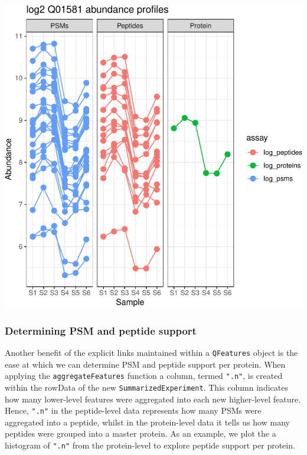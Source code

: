 \documentclass[9pt,a4paper,]{extarticle}
\begin{document}
\begin{center}\includegraphics[width=0.8\linewidth]{workflow_expressions_files/figure-latex/qfeatures_links_plots-1} \end{center}

\subsubsection{Determining PSM and peptide support}\label{determining-psm-and-peptide-support}

Another benefit of the explicit links maintained within a \texttt{QFeatures} object is
the ease at which we can determine PSM and peptide support per protein. When
applying the \texttt{aggregateFeatures} function a column, termed \texttt{".n"}, is created
within the rowData of the new \texttt{SummarizedExperiment}. This column indicates how
many lower-level features were aggregated into each new higher-level feature.
Hence, \texttt{".n"} in the peptide-level data represents how many PSMs were aggregated
into a peptide, whilst in the protein-level data it tells us how many peptides
were grouped into a master protein. As an example, we plot the a histogram of
\texttt{".n"} from the protein-level to explore peptide support per protein.
\end{document}
